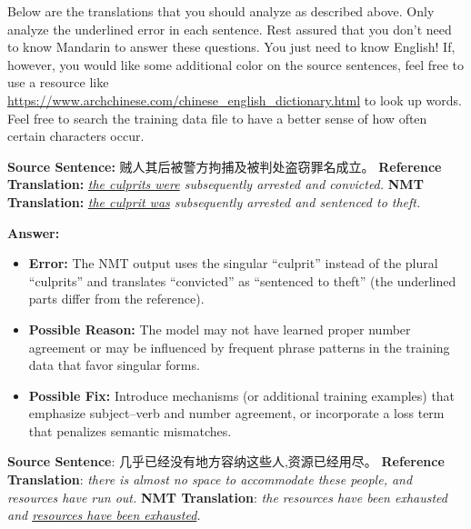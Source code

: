 \begin{parts}
    Below are the translations that you should analyze as described above. Only analyze the underlined error in each sentence. Rest assured that you don't need to know Mandarin to answer these questions. You just need to know English! If, however, you would like some additional color on the source sentences, feel free to use a resource like \url{https://www.archchinese.com/chinese_english_dictionary.html} to look up words. Feel free to search the training data file to have a better sense of how often certain characters occur.

    \begin{subparts}
        \subpart[2]
        \textbf{Source Sentence:} 贼人其后被警方拘捕及被判处盗窃罪名成立。 \newline
        \textbf{Reference Translation:} \textit{\underline{the culprits were} subsequently arrested and convicted.}\newline
        \textbf{NMT Translation:} \textit{\underline{the culprit was} subsequently arrested and sentenced to theft.}
        
        {\color{red}
            \textbf{Answer:}
            \begin{itemize}
                \item \textbf{Error:} The NMT output uses the singular “culprit” instead of the plural “culprits” and translates “convicted” as “sentenced to theft” (the underlined parts differ from the reference).
                \item \textbf{Possible Reason:} The model may not have learned proper number agreement or may be influenced by frequent phrase patterns in the training data that favor singular forms.
                \item \textbf{Possible Fix:} Introduce mechanisms (or additional training examples) that emphasize subject–verb and number agreement, or incorporate a loss term that penalizes semantic mismatches.
            \end{itemize}
        }

        \subpart[2]
        \textbf{Source Sentence}: 几乎已经没有地方容纳这些人,资源已经用尽。\newline
        \textbf{Reference Translation}: \textit{there is almost no space to accommodate these people, and resources have run out.   }\newline
        \textbf{NMT Translation}: \textit{the resources have been exhausted and \underline{resources have been exhausted}.}
        

\end{subparts}
\end{parts}
